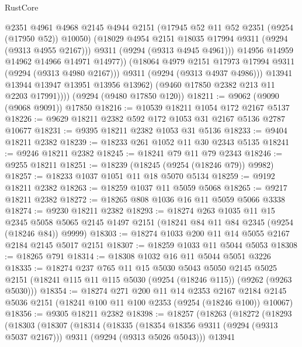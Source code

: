 \begin{lexlean}{RustCore}
\begin{coremodule}
                    @2351
                    @4961
                    @4968
                    @2145
                    @4944
                    @2151
                    (@17945 @52 @11 @52 @2351 (@9254 (@17950 @52)) @10050)
                    (@18029 @4954 @2151 @18035 @17994 @9311 (@9294 (@9313 @4955 @2167)))
                    @9311
                    (@9294 (@9313 @4945 @4961)))
                  @14956
                  @14959
                  @14962
                  @14966
                  @14971
                  @14977))
              (@18064 @4979 @2151 @17973 @17994 @9311 (@9294 (@9313 @4980 @2167)))
              @9311
              (@9294 (@9313 @4937 @4986)))
            @13941
            @13944
            @13947
            @13951
            @13956
            @13962)
          (@9460 @17850 @2382 @213 @11 @2203 @17991))))
    (@9294 (@9480 @17850 @120))
@18211 := @9062 (@9090 (@9068 @9091)) @17850
@18216 := @10539 @18211 @1054 @172 @2167 @5137
@18226 := @9629 @18211 @2382 @592 @172 @1053 @31 @2167 @5136 @2787 @10677
@18231 := @9395 @18211 @2382 @1053 @31 @5136
@18233 := @9404 @18211 @2382
@18239 := @18233 @261 @1052 @11 @30 @2343 @5135
@18241 := @9246 @18211 @2382
@18245 := @18241 @79 @11 @79 @2343
@18246 := @9255 @18211
@18251 := @18239 (@18245 (@9254 (@18246 @79)) @9982)
@18257 := @18233 @1037 @1051 @11 @18 @5070 @5134
@18259 := @9192 @18211 @2382
@18263 := @18259 @1037 @11 @5059 @5068
@18265 := @9217 @18211 @2382
@18272 := @18265 @808 @1036 @16 @11 @5059 @5066 @3338
@18274 := @9230 @18211 @2382
@18293 := @18274
    @263
    @1035
    @11
    @15
    @2345
    @5058
    @5065
    @2145
    @1497
    @2151
    (@18241 @84 @11 @84 @2345 (@9254 (@18246 @84)) @9999)
@18303 := @18274 @1033 @200 @11 @14 @5055 @2167 @2184 @2145 @5017 @2151
@18307 := @18259 @1033 @11 @5044 @5053
@18308 := @18265 @791
@18314 := @18308 @1032 @16 @11 @5044 @5051 @3226
@18335 := @18274
    @237
    @765
    @11
    @15
    @5030
    @5043
    @5050
    @2145
    @5025
    @2151
    (@18241 @115 @11 @115 @5030 (@9254 (@18246 @115)) (@9262 (@9263 @5030)))
@18354 := @18274
    @271
    @200
    @11
    @14
    @2353
    @2167
    @2184
    @2145
    @5036
    @2151
    (@18241 @100 @11 @100 @2353 (@9254 (@18246 @100)) @10067)
@18356 := @9305 @18211 @2382
@18398 := @18257
    (@18263
      (@18272
        (@18293
          (@18303
            (@18307
              (@18314
                (@18335
                  (@18354 @18356 @9311 (@9294 (@9313 @5037 @2167)))
                  @9311
                  (@9294 (@9313 @5026 @5043)))
                @13941

\end{coremodule}
\end{lexlean}
